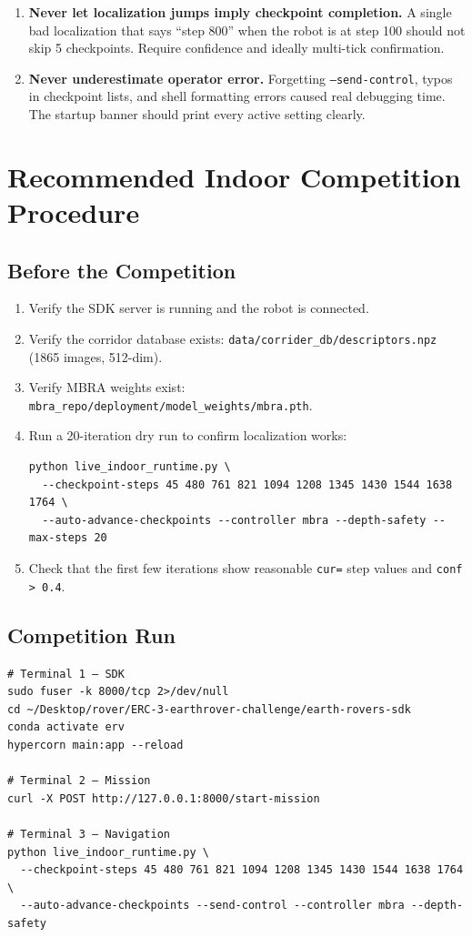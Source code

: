 \documentclass[11pt]{article}
\begin{document}
\begin{enumerate}
\item \textbf{Never let localization jumps imply checkpoint completion.} A single bad localization that says ``step 800'' when the robot is at step 100 should not skip 5 checkpoints. Require confidence and ideally multi-tick confirmation.

\item \textbf{Never underestimate operator error.} Forgetting \texttt{--send-control}, typos in checkpoint lists, and shell formatting errors caused real debugging time. The startup banner should print every active setting clearly.
\end{enumerate}


\section{Recommended Indoor Competition Procedure}

\subsection{Before the Competition}
\begin{enumerate}
\item Verify the SDK server is running and the robot is connected.
\item Verify the corridor database exists: \texttt{data/corrider\_db/descriptors.npz} (1865 images, 512-dim).
\item Verify MBRA weights exist: \texttt{mbra\_repo/deployment/model\_weights/mbra.pth}.
\item Run a 20-iteration dry run to confirm localization works:
\begin{lstlisting}
python live_indoor_runtime.py \
  --checkpoint-steps 45 480 761 821 1094 1208 1345 1430 1544 1638 1764 \
  --auto-advance-checkpoints --controller mbra --depth-safety --max-steps 20
\end{lstlisting}
\item Check that the first few iterations show reasonable \texttt{cur=} step values and \texttt{conf > 0.4}.
\end{enumerate}

\subsection{Competition Run}
\begin{lstlisting}
# Terminal 1 — SDK
sudo fuser -k 8000/tcp 2>/dev/null
cd ~/Desktop/rover/ERC-3-earthrover-challenge/earth-rovers-sdk
conda activate erv
hypercorn main:app --reload

# Terminal 2 — Mission
curl -X POST http://127.0.0.1:8000/start-mission

# Terminal 3 — Navigation
python live_indoor_runtime.py \
  --checkpoint-steps 45 480 761 821 1094 1208 1345 1430 1544 1638 1764 \
  --auto-advance-checkpoints --send-control --controller mbra --depth-safety
\end{lstlisting}
\end{document}
